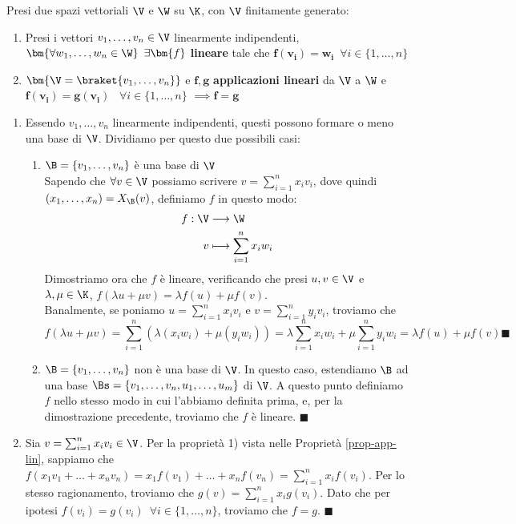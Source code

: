 \documentclass[11pt, a4paper, titlepage, oneside]{scrbook}
\begin{document}
\begin{Proposizione}[Lemmi]
\label{lemmi-matrici-e-app-lin}
Presi due spazi vettoriali $\V$ e $\W$ su $\K$, con $\V$ finitamente generato:
\begin{enumerate}[label=\Roman*)]
    \item Presi i vettori $v_1, \ldots, v_n \in \V$ linearmente indipendenti, $\bm{\forall w_1, \ldots, w_n \in \W} \enspace \exists \bm{f}$ \textbf{lineare} tale che $\bm{f(v_i) = w_i} \enspace \forall i \in \{1,\ldots,n\}$
    \item $\bm{\V = \braket{v_1, \ldots, v_n}}$ e $\bm{f,g}$ \textbf{applicazioni lineari} da $\V$ a $\W$ e $\bm{f(v_i) = g(v_i)} \enspace$ \mbox{$\forall i \in \{1,\ldots,n\}$} $\implies \bm{f = g}$
\end{enumerate}
\end{Proposizione}

\Dimostrazione \nopagebreak

\begin{enumerate}[label=\Roman*)]
    \item Essendo $v_1, \ldots, v_n$ linearmente indipendenti, questi possono formare o meno una base di $\V$. Dividiamo per questo due possibili casi:
    \begin{enumerate}[label=\arabic*°]
        \item $\B = \{v_1, \ldots, v_n\}$ è una base di $\V$ \\
        Sapendo che $\forall v \in \V$ possiamo scrivere $v = \sum_{i = 1}^n x_i v_i$, dove quindi $(x_1, \ldots, x_n) = X_\B(v)$, definiamo $f$ in questo modo:
        \begin{align*}
            f: \V &\longrightarrow \W \\
            v &\longmapsto \sum_{i = 1}^n x_i w_i
         \end{align*}
         Dimostriamo ora che $f$ è lineare, verificando che presi $u,v \in \V$ e $\lambda, \mu \in \K$, \mbox{$f(\lambda u + \mu v) = \lambda f(u) + \mu f(v)$}. \\
         Banalmente, se poniamo $u = \sum_{i = 1}^n x_i v_i$ e $v = \sum_{i = 1}^n y_i v_i$, troviamo che
         \[f(\lambda u + \mu v) = \sum_{i = 1}^n (\lambda (x_i w_i) + \mu (y_i w_i)) = \lambda \sum_{i = 1}^n x_i w_i + \mu \sum_{i = 1}^n y_i w_i = \lambda f(u) + \mu f(v) \blacksquare\]
    \item $\B = \{v_1, \ldots, v_n\}$ non è una base di $\V$.
    In questo caso, estendiamo $\B$ ad una base $\Bs = \{v_1, \ldots, v_n, u_1, \ldots, u_m\}$ di $\V$. A questo punto definiamo $f$ nello stesso modo in cui l'abbiamo definita prima, e, per la dimostrazione precedente, troviamo che $f$ è lineare. $\blacksquare$
    \end{enumerate}
    \item Sia $v = \sum_{i = 1}^n x_i v_i \in \V$. Per la proprietà 1) vista nelle Proprietà \ref{prop-app-lin}, sappiamo che \mbox{$f(x_1 v_1 + \ldots + x_n v_n) = x_1 f(v_1) + \ldots + x_n f(v_n) = \sum_{i = 1}^n x_i f(v_i)$}. Per lo stesso ragionamento, troviamo che $g(v) = \sum_{i = 1}^n x_i g(v_i)$. Dato che per ipotesi $f(v_i) = g(v_i) \enspace \forall i \in \{1, \ldots, n\}$, troviamo che $f = g$. $\blacksquare$ 
\end{enumerate}
\end{document}
